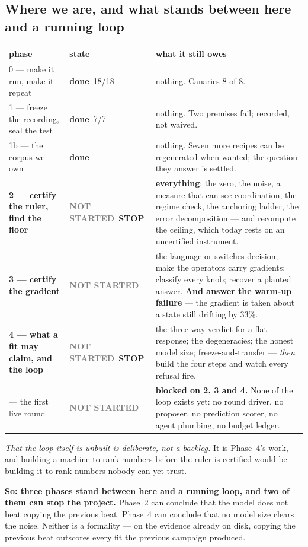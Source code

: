\documentclass[11pt,a4paper]{article}
\newcommand{\dn}{\textcolor{good}{\textbf{done}}}
\newcommand{\todo}{\textcolor{grey}{\textbf{NOT STARTED}}}
\newcommand{\stopp}{\textcolor{bad!30!white}{\textbf{STOP}}}
\begin{document}
\subsection*{Where we are, and what stands between here and a running loop}

\begin{center}\footnotesize
\begin{tabular}{@{}p{4.0cm} l p{7.5cm}@{}}
\toprule
\textbf{phase} & \textbf{state} & \textbf{what it still owes}\\
\midrule
0 --- make it run, make it repeat & \dn\ 18/18 & nothing. Canaries 8 of 8.\\
1 --- freeze the recording, seal the test & \dn\ 7/7 & nothing. Two premises fail; recorded, not
waived.\\
1b --- the corpus we own & \dn & nothing. Seven more recipes can be regenerated when wanted; the
question they answer is settled.\\
\addlinespace
\textbf{2 --- certify the ruler, find the floor} & \todo\ \stopp & \textbf{everything}: the zero,
the noise, a measure that can see coordination, the regime check, the anchoring ladder, the error
decomposition --- and recompute the ceiling, which today rests on an uncertified instrument.\\
\textbf{3 --- certify the gradient} & \todo & the language-or-switches decision; make the operators
carry gradients; classify every knob; recover a planted answer. \textbf{And answer the warm-up
failure} --- the gradient is taken about a state still drifting by 33\%.\\
\textbf{4 --- what a fit may claim, and the loop} & \todo\ \stopp & the three-way verdict for a flat
response; the degeneracies; the honest model size; freeze-and-transfer --- \emph{then} build the
four steps and watch every refusal fire.\\
\addlinespace
5 --- the first live round & \todo & \textbf{blocked on 2, 3 and 4.} None of the loop exists yet:
no round driver, no proposer, no prediction scorer, no agent plumbing, no budget ledger.\\
\bottomrule
\end{tabular}
\end{center}

\emph{That the loop itself is unbuilt is deliberate, not a backlog.} It is Phase~4's work, and
building a machine to rank numbers before the ruler is certified would be building it to rank
numbers nobody can yet trust.

\textbf{So: three phases stand between here and a running loop, and two of them can stop the
project.} Phase~2 can conclude that the model does not beat copying the previous beat. Phase~4 can
conclude that no model size clears the noise. Neither is a formality --- on the evidence already on
disk, copying the previous beat outscores every fit the previous campaign produced.
\end{document}
